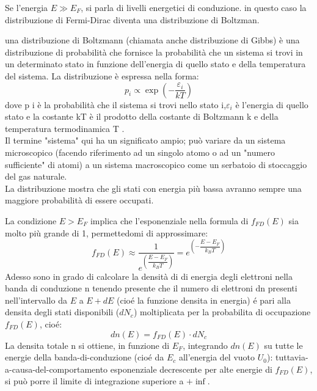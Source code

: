 %
Se l'energia $E \gg E_F$, si parla di livelli energetici di conduzione. in questo caso la distribuzione di Fermi-Dirac diventa una distribuzione di Boltzman.
%
\begin{exbox}
    una distribuzione di Boltzmann (chiamata anche distribuzione di Gibbs) è una distribuzione di probabilità che fornisce la probabilità che un sistema si trovi in un determinato stato in funzione dell'energia di quello stato e della temperatura del sistema. La distribuzione è espressa nella forma:
    \begin{equation}
        {\displaystyle p_{i}\propto \exp \left(-{\frac {\varepsilon_{i}}{kT}}\right)}
    \end{equation}
    dove p i è la probabilità che il sistema si trovi nello stato i,$\varepsilon_i$ è l'energia di quello stato e la costante kT è il prodotto della costante di Boltzmann k e della temperatura termodinamica T .\\
    Il termine "sistema" qui ha un significato ampio; può variare da un sistema microscopico (facendo riferimento ad un singolo atomo o ad un "numero sufficiente" di atomi) a un sistema macroscopico come un serbatoio di stoccaggio del gas naturale.\\
     La distribuzione mostra che gli stati con energia più bassa avranno sempre una maggiore probabilità di essere occupati.
\end{exbox}
%
La condizione $E > E_F$ implica che l'esponenziale nella formula di $f_{FD}(E)$ sia molto più grande di 1, permettedomi di approssimare:
%
\begin{equation}
    f_{FD}(E) \approx \dfrac{1}{e^{\left(\dfrac{E-E_F}{k_B T}\right)}} = e^{\left(-\dfrac{E-E_F}{k_B T}\right)}
\end{equation}
%
Adesso sono in grado di calcolare la densità di di energia degli elettroni nella banda di conduzione n tenendo presente che il numero di elettroni dn presenti nell'intervallo da $E$ a $E+dE$ (cioé la funzione densita in energia) é pari alla densita degli stati disponibili ($dN_c$)
moltiplicata per la probabilita di occupazione $f_{FD}(E)$, cioé: 
%
\begin{equation}
    dn(E) = f_{FD}(E)\cdot dN_c
\end{equation}
%
La densita totale n si ottiene, in funzione di $E_F$, integrando $dn(E)$ su tutte le energie della banda-di-conduzione (cioé da $E_c$ all'energia del vuoto $U_0$): tuttavia-a-causa-del-comportamento esponenziale decrescente per alte energie di $f_{FD}(E)$, si può porre il limite di integrazione superiore a $+ \inf $.
